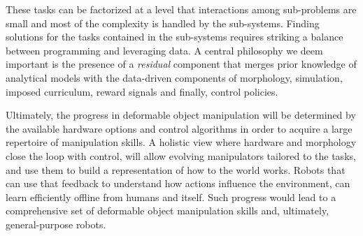 \documentclass[\home/main.tex]{subfiles}
\begin{document}
These tasks can be factorized at a level that interactions among sub-problems are small and most of the complexity is handled by the sub-systems. %
Finding solutions for the tasks contained in the sub-systems requires striking a balance between programming and leveraging data. A central philosophy we deem important is the presence of a \emph{residual} component that merges prior knowledge of analytical models with the data-driven components of morphology, simulation, imposed curriculum, reward signals and finally, control policies. 

Ultimately, the progress in deformable object manipulation will be determined by the available hardware options and control algorithms in order to acquire a large repertoire of manipulation skills. A holistic view where hardware and morphology close the loop with control, will allow evolving manipulators tailored to the tasks, and use them to build a representation of how to the world works. %
Robots that can use that feedback to understand how actions influence the environment, can learn efficiently offline from humans and itself. Such progress would lead to a comprehensive set of deformable object manipulation skills and, ultimately, general-purpose robots. 


\end{document}
